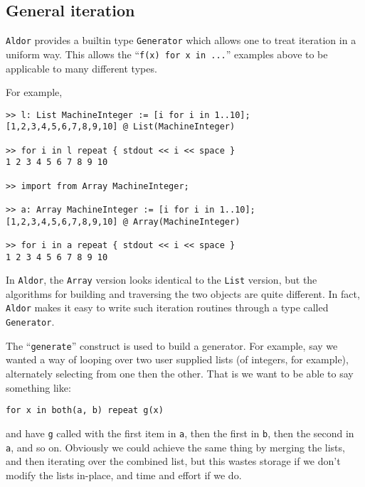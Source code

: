 \documentclass{article}
\newcommand{\Aldor}{{\tt Aldor}}
\begin{document}
\subsection{General iteration}
\label{sec:geniter}

\Aldor{} provides a builtin type {\tt Generator} which allows one to
treat iteration in a uniform way.  This allows the ``{\tt f(x) for x
in ...}'' examples above to be applicable to many different types.

For example,
\begin{small}
\begin{verbatim}
>> l: List MachineInteger := [i for i in 1..10];
[1,2,3,4,5,6,7,8,9,10] @ List(MachineInteger)

>> for i in l repeat { stdout << i << space }
1 2 3 4 5 6 7 8 9 10 

>> import from Array MachineInteger;

>> a: Array MachineInteger := [i for i in 1..10];
[1,2,3,4,5,6,7,8,9,10] @ Array(MachineInteger)

>> for i in a repeat { stdout << i << space }
1 2 3 4 5 6 7 8 9 10 
\end{verbatim}
\end{small}

In \Aldor, the {\tt Array} version looks identical to the {\tt List}
version, but the algorithms for building and traversing the two objects
are quite different.  In fact, \Aldor{} makes it easy to write such
iteration routines through a type called {\tt Generator}.

The ``{\tt generate}'' construct is used to build a generator.  For
example, say we wanted a way of looping over two user supplied lists
(of integers, for example), alternately selecting from one then the
other.  That is we want to be able to say something like:
\begin{small}
\begin{verbatim}
for x in both(a, b) repeat g(x)
\end{verbatim}
\end{small}
and have {\tt g} called with the first item in {\tt a}, then the first
in {\tt b}, then the second in {\tt a}, and so on.  Obviously we could
achieve the same thing by merging the lists, and then iterating over
the combined list, but this wastes storage if we don't modify the
lists in-place, and time and effort if we do.
\end{document}

